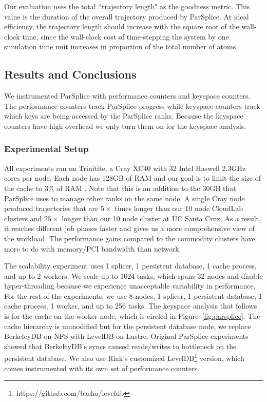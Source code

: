 Our evaluation uses the total ``trajectory length" as the goodness metric. This
value is the duration of the overall trajectory produced by ParSplice. At
ideal efficiency, the trajectory length should increase with the square root of
the wall-clock time, since the wall-clock cost of time-stepping the system by
one simulation time unit increases in proportion of the total number of atoms.

\subsection{Results and Conclusions}
\label{sec:parsplice-keyspace-analysis}

We instrumented ParSplice with performance counters and keyspace counters.  The
performance counters track ParSplice progress while keyspace counters track
which keys are being accessed by the ParSplice ranks. Because the keyspace
counters have high overhead we only turn them on for the keyspace analysis.

\subsubsection*{Experimental Setup} All experiments ran on Trinitite, a Cray
XC40 with 32 Intel Haswell 2.3GHz cores per node.  Each node has 128GB of RAM
and our goal is to limit the size of the cache to 3\% of RAM . Note that this
is an addition to the 30GB that ParSplice uses to manage other ranks on the
same node.  A single Cray node produced trajectories that are \(5\times\) times
longer than our 10 node CloudLab clusters and \(25\times\) longer than our 10
node cluster at UC Santa Cruz. As a result, it reaches different job phases faster and
gives us a more comprehensive view of the workload. The performance gains
compared to the commodity clusters have more to do with memory/PCI bandwidth
than network.

The scalability experiment uses 1 splicer, 1 persistent database, 1 cache
process, and up to 2 workers. We scale up to 1024 tasks, which spans 32 nodes
and disable hyper-threading because we experience unacceptable variability in
performance. For the rest of the experiments, we use 8 nodes, 1 splicer, 1
persistent database, 1 cache process, 1 worker, and up to 256 tasks.  The
keyspace analysis that follows is for the cache on the worker node, which is
circled in Figure~\ref{fig:parsplice}.  The cache hierarchy is unmodified but
for the persistent database node, we replace BerkeleyDB on NFS with LevelDB on
Lustre. Original ParSplice experiments showed that BerkeleyDB's syncs caused
reads/writes to bottleneck on the persistent database. We also use Riak's
customized LevelDB\footnote{https://github.com/basho/leveldb} version, which
comes instrumented with its own set of performance counters.

